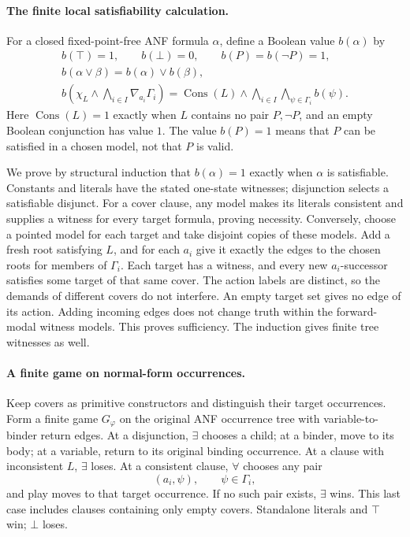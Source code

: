 \paragraph{The finite local satisfiability calculation.}
For a closed fixed-point-free
ANF formula \(\alpha\), define
a Boolean value \(b(\alpha)\) by
\[
\begin{gathered}
 b(\top)=1,\qquad b(\bot)=0,\qquad
 b(P)=b(\neg P)=1,\\
 b(\alpha\lor\beta)
       =b(\alpha)\lor b(\beta),\\
 b\left(\chi_L\land
            \bigwedge_{i\in I}\nabla_{a_i}\Gamma_i\right)
       =\operatorname{Cons}(L)\land
           \bigwedge_{i\in I}\bigwedge_{\psi\in\Gamma_i}b(\psi).
\end{gathered}
\]
Here \(\operatorname{Cons}(L)=1\)
exactly when \(L\) contains
no pair \(P,\neg P\), and
an empty Boolean conjunction
has value \(1\).
The value \(b(P)=1\) means
that \(P\) can be satisfied
in a chosen model, not that
\(P\) is valid.

We prove by structural induction
that \(b(\alpha)=1\) exactly
when \(\alpha\) is satisfiable.
Constants and literals have
the stated one-state witnesses;
disjunction selects a satisfiable
disjunct. For a cover clause,
any model makes its literals
consistent and supplies a
witness for every target
formula, proving necessity.
Conversely, choose a pointed
model for each target and
take disjoint copies of these
models. Add a fresh root
satisfying \(L\), and for
each \(a_i\) give it exactly
the edges to the chosen
roots for members of
\(\Gamma_i\).
Each target has a witness,
and every new \(a_i\)-successor
satisfies some target of
that same cover.
The action labels are distinct,
so the demands of different
covers do not interfere.
An empty target set gives
no edge of its action.
Adding incoming edges does
not change truth within
the forward-modal witness
models. This proves sufficiency.
The induction gives finite
tree witnesses as well.

\paragraph{A finite game on normal-form occurrences.}
\label{sec:p09-mu-anf-occurrence-game}
Keep covers as primitive
constructors and distinguish
their target occurrences.
Form a finite game
\(G_\varphi\) on the original
ANF occurrence tree with
variable-to-binder return edges.
At a disjunction, \(\exists\)
chooses a child; at a binder,
move to its body; at a
variable, return to its
original binding occurrence.
At a clause with inconsistent
\(L\), \(\exists\) loses.
At a consistent clause,
\(\forall\) chooses any pair
\[
 (a_i,\psi),\qquad \psi\in\Gamma_i,
\]
and play moves to that
target occurrence. If no
such pair exists, \(\exists\)
wins. This last case includes
clauses containing only empty
covers. Standalone literals
and \(\top\) win; \(\bot\)
loses.

